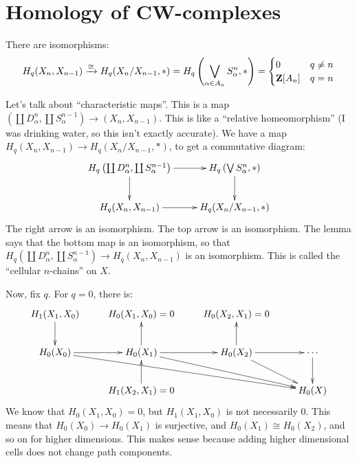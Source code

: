 \section{Homology of CW-complexes}
\begin{lemma}
There are isomorphisms:
\begin{equation*}
 H_q(X_n,X_{n-1})\xrightarrow{\cong} H_q(X_n/X_{n-1},\ast)= H_q\left(\bigvee_{\alpha\in A_n}S^n_\alpha,\ast\right)=\begin{cases}0 & q\neq n \\ \mathbf Z[A_n] & q=n\end{cases}
\end{equation*}
\end{lemma}
Let's talk about ``characteristic maps''. This is a map $\left(\coprod D^n_\alpha,\coprod S^{n-1}_\alpha\right)\to (X_n,X_{n-1})$. This is like a ``relative homeomorphism'' (I was drinking water, so this isn't exactly accurate). We have a map $ H_q(X_n,X_{n-1})\to H_q(X_n/X_{n-1},\ast)$, to get a commutative diagram:
\begin{equation*}
\xymatrix{ H_q\left(\coprod D^n_\alpha,\coprod S^{n-1}_\alpha\right)\ar[r]\ar[d] & H_q\left(\bigvee S^n_\alpha,\ast\right)\ar[d]\\
 H_q(X_n,X_{n-1})\ar[r] & H_q(X_n/X_{n-1},\ast)}
\end{equation*}
The right arrow is an isomorphism. The top arrow is an isomorphism. The lemma says that the bottom map is an isomorphism, so that $ H_q\left(\coprod D^n_\alpha,\coprod S^{n-1}_\alpha\right)\to H_q(X_n,X_{n-1})$ is an isomorphism. This is called the ``cellular $n$-chains'' on $X$.

Now, fix $q$. For $q=0$, there is:
\begin{equation*}
\xymatrix{ H_1(X_1,X_0)\ar[d] & H_0(X_1,X_0)=0 & H_0(X_2,X_1)=0\\
 H_0(X_0)\ar[r]\ar[drrr] & H_0(X_1)\ar[r]\ar[drr]\ar[u] & H_0(X_2)\ar[u]\ar[r]\ar[dr] & \cdots\ar[d]\\
 & H_1(X_2,X_1)=0\ar[u] & & H_0(X)}
\end{equation*}
We know that $ H_0(X_1,X_0)=0$, but $ H_1(X_1,X_0)$ is not necessarily $0$. This means that $ H_0(X_0)\to H_0(X_1)$ is surjective, and $ H_0(X_1)\cong H_0(X_2)$, and so on for higher dimensions. This makes sense because adding higher dimensional cells does not change path components.

